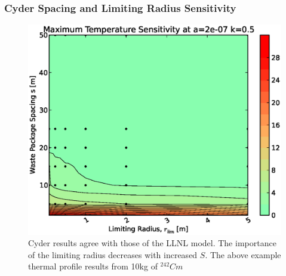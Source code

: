 \begin{frame}[ctb!]
\frametitle{Cyder Spacing and Limiting Radius Sensitivity}
\footnotesize{
\begin{figure}[htbp!]
\begin{center}
\includegraphics[height=0.7\textheight]{./thermal_demonstration/spacing/rs.eps}
\end{center}
\caption[$\alpha_{th}$ vs. $r_{lim}$ Sensitivity in Cyder]{Cyder results agree with 
those of the LLNL model. The importance of the limiting radius decreases with 
increased $S$. The above example thermal profile results from 10kg of 
$^{242}Cm$}
\label{fig:rs}
\end{figure}
}
\end{frame}
